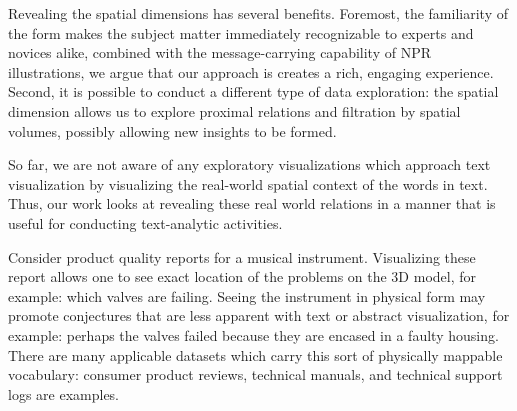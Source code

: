
Revealing the spatial dimensions has several benefits. Foremost, the
familiarity of the form makes the subject matter immediately recognizable
to experts and novices alike, combined with the message-carrying
capability of NPR illustrations, we argue that our approach is creates a
rich, engaging experience. Second, it is possible to conduct a different
type of data exploration: the spatial dimension allows us to explore
proximal relations and filtration by spatial volumes, possibly allowing
new insights to be formed.

So far, we are not aware of any exploratory visualizations which approach text
visualization by visualizing the real-world spatial context of the words in
text. Thus, our work looks at revealing these real world relations in a manner
that is useful for conducting text-analytic activities.

Consider product quality reports for a musical instrument. Visualizing
these report allows one to see exact location of the problems on the
3D model, for example: which valves are failing. Seeing the instrument
in physical form may promote conjectures that are less apparent
with text or abstract visualization, for example: perhaps the valves
failed because they are encased in a faulty housing. There are many
applicable datasets which carry this sort of physically mappable vocabulary:
consumer product reviews, technical manuals, and technical
support logs are examples.



